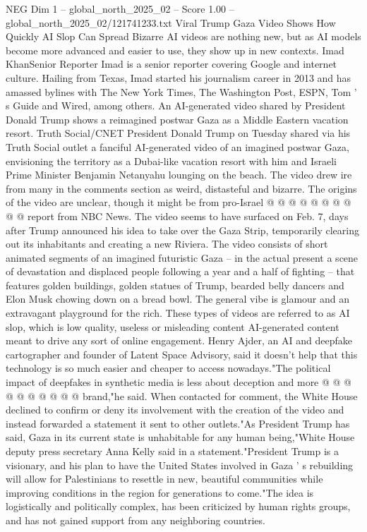 \begin{textsample}{NEG Dim 1 – global\_north\_2025\_02 – Score 1.00 – global\_north\_2025\_02/121741233.txt}  \label{ex:f1_neg_012}
Viral Trump Gaza Video Shows How Quickly AI Slop Can Spread Bizarre AI videos are nothing new, but as AI models become more advanced and easier to use, they show up in new contexts.
Imad KhanSenior Reporter Imad is a senior reporter covering Google and internet culture.
Hailing from Texas, Imad started his journalism career in 2013 and has amassed bylines with The New York Times, The Washington Post, ESPN, Tom ' s Guide and Wired, among others.
An AI-generated video shared by President Donald Trump shows a reimagined postwar Gaza as a Middle Eastern vacation resort.
Truth Social/CNET President Donald Trump on Tuesday shared via his Truth Social outlet a fanciful AI-generated video of an imagined postwar Gaza, envisioning the territory as a Dubai-like vacation resort with him and Israeli Prime Minister Benjamin Netanyahu lounging on the beach.
The video drew ire from many in the comments section as weird, distasteful and bizarre.
The origins of the video are unclear, though it might be from pro-Israel @ @ @ @ @ @ @ @ @ @ report from NBC News.
The video seems to have surfaced on Feb. 7, days after Trump announced his idea to take over the Gaza Strip, temporarily clearing out its inhabitants and creating a new Riviera.
The video consists of short animated segments of an imagined futuristic Gaza -- in the actual present a scene of devastation and displaced people following a year and a half of fighting -- that features golden buildings, golden statues of Trump, bearded belly dancers and Elon Musk chowing down on a bread bowl.
The general vibe is glamour and an extravagant playground for the rich.
These types of videos are referred to as AI slop, which is low quality, useless or misleading content AI-generated content meant to drive any sort of online engagement.
Henry Ajder, an AI and deepfake cartographer and founder of Latent Space Advisory, said it doesn't help that this technology is so much easier and cheaper to access nowadays."The political impact of deepfakes in synthetic media is less about deception and more @ @ @ @ @ @ @ @ @ @ brand,"he said.
When contacted for comment, the White House declined to confirm or deny its involvement with the creation of the video and instead forwarded a statement it sent to other outlets."As President Trump has said, Gaza in its current state is unhabitable for any human being,"White House deputy press secretary Anna Kelly said in a statement."President Trump is a visionary, and his plan to have the United States involved in Gaza ' s rebuilding will allow for Palestinians to resettle in new, beautiful communities while improving conditions in the region for generations to come."The idea is logistically and politically complex, has been criticized by human rights groups, and has not gained support from any neighboring countries.

\end{textsample}
